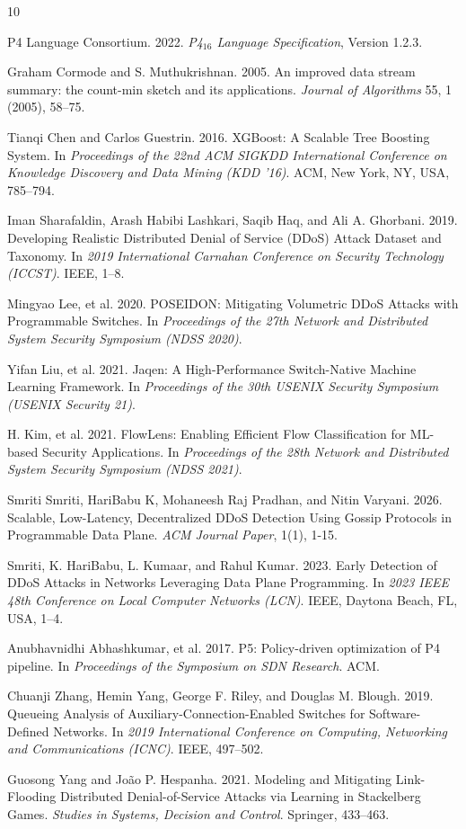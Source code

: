 \documentclass[sigconf, nonacm]{acmart}
\begin{document}
\balance

\begin{thebibliography}{10}

P4 Language Consortium. 2022. \textit{P4$_{16}$ Language Specification}, Version 1.2.3.

Graham Cormode and S. Muthukrishnan. 2005. An improved data stream summary: the count-min sketch and its applications. \textit{Journal of Algorithms} 55, 1 (2005), 58--75.

Tianqi Chen and Carlos Guestrin. 2016. XGBoost: A Scalable Tree Boosting System. In \textit{Proceedings of the 22nd ACM SIGKDD International Conference on Knowledge Discovery and Data Mining (KDD '16)}. ACM, New York, NY, USA, 785--794.

Iman Sharafaldin, Arash Habibi Lashkari, Saqib Haq, and Ali A. Ghorbani. 2019. Developing Realistic Distributed Denial of Service (DDoS) Attack Dataset and Taxonomy. In \textit{2019 International Carnahan Conference on Security Technology (ICCST)}. IEEE, 1--8.

Mingyao Lee, et al. 2020. POSEIDON: Mitigating Volumetric DDoS Attacks with Programmable Switches. In \textit{Proceedings of the 27th Network and Distributed System Security Symposium (NDSS 2020)}.

Yifan Liu, et al. 2021. Jaqen: A High-Performance Switch-Native Machine Learning Framework. In \textit{Proceedings of the 30th USENIX Security Symposium (USENIX Security 21)}.

H. Kim, et al. 2021. FlowLens: Enabling Efficient Flow Classification for ML-based Security Applications. In \textit{Proceedings of the 28th Network and Distributed System Security Symposium (NDSS 2021)}.

Smriti Smriti, HariBabu K, Mohaneesh Raj Pradhan, and Nitin Varyani. 2026. Scalable, Low-Latency, Decentralized DDoS Detection Using Gossip Protocols in Programmable Data Plane. \textit{ACM Journal Paper}, 1(1), 1-15.

Smriti, K. HariBabu, L. Kumaar, and Rahul Kumar. 2023. Early Detection of DDoS Attacks in Networks Leveraging Data Plane Programming. In \textit{2023 IEEE 48th Conference on Local Computer Networks (LCN)}. IEEE, Daytona Beach, FL, USA, 1--4.

Anubhavnidhi Abhashkumar, et al. 2017. P5: Policy-driven optimization of P4 pipeline. In \textit{Proceedings of the Symposium on SDN Research}. ACM.

Chuanji Zhang, Hemin Yang, George F. Riley, and Douglas M. Blough. 2019. Queueing Analysis of Auxiliary-Connection-Enabled Switches for Software-Defined Networks. In \textit{2019 International Conference on Computing, Networking and Communications (ICNC)}. IEEE, 497--502.

Guosong Yang and João P. Hespanha. 2021. Modeling and Mitigating Link-Flooding Distributed Denial-of-Service Attacks via Learning in Stackelberg Games. \textit{Studies in Systems, Decision and Control}. Springer, 433--463.

\end{thebibliography}
\end{document}
